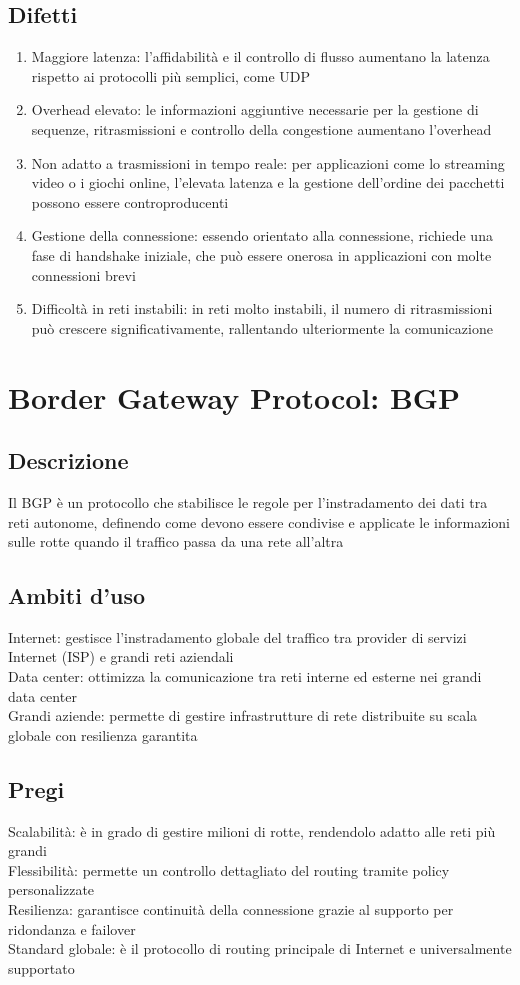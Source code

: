\documentclass[10pt,oneside,a4paper]{article}
\begin{document}
\subsection{Difetti}
\begin{enumerate}
\item Maggiore latenza: l'affidabilità e il controllo di flusso aumentano la latenza rispetto ai protocolli più semplici, come UDP
\item Overhead elevato: le informazioni aggiuntive necessarie per la gestione di sequenze, ritrasmissioni e controllo della congestione aumentano l'overhead
\item Non adatto a trasmissioni in tempo reale: per applicazioni come lo streaming video o i giochi online, l'elevata latenza e la gestione dell'ordine dei pacchetti possono essere controproducenti
\item Gestione della connessione: essendo orientato alla connessione, richiede una fase di handshake iniziale, che può essere onerosa in applicazioni con molte connessioni brevi
\item Difficoltà in reti instabili: in reti molto instabili, il numero di ritrasmissioni può crescere significativamente, rallentando ulteriormente la comunicazione
\end{enumerate}
\section{Border Gateway Protocol: BGP}
\subsection{Descrizione}
Il BGP è un protocollo che stabilisce le regole per l'instradamento dei dati tra reti autonome, definendo come devono essere condivise e applicate le informazioni sulle rotte quando il traffico passa da una rete all'altra
\subsection{Ambiti d'uso}
Internet: gestisce l'instradamento globale del traffico tra provider di servizi Internet (ISP) e grandi reti aziendali\\
Data center: ottimizza la comunicazione tra reti interne ed esterne nei grandi data center\\
Grandi aziende: permette di gestire infrastrutture di rete distribuite su scala globale con resilienza garantita
\subsection{Pregi}
Scalabilità: è in grado di gestire milioni di rotte, rendendolo adatto alle reti più grandi\\
Flessibilità: permette un controllo dettagliato del routing tramite policy personalizzate\\
Resilienza: garantisce continuità della connessione grazie al supporto per ridondanza e failover\\
Standard globale: è il protocollo di routing principale di Internet e universalmente supportato
\end{document}
